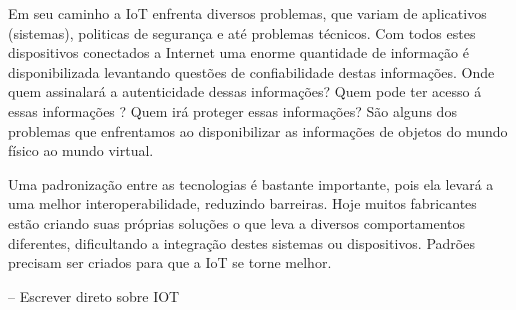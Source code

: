 Em seu caminho a IoT enfrenta diversos problemas, que variam de aplicativos (sistemas), politicas de segurança e até problemas técnicos. Com todos estes dispositivos conectados a Internet uma enorme quantidade de informação é disponibilizada levantando questões de confiabilidade destas informações. Onde quem assinalará a autenticidade dessas informações? Quem pode ter acesso á essas informações ? Quem irá proteger essas informações? São alguns dos problemas que enfrentamos ao disponibilizar as informações de objetos do mundo físico ao mundo virtual.

Uma padronização entre as tecnologias é bastante importante, pois ela levará a uma melhor interoperabilidade, reduzindo barreiras. Hoje muitos fabricantes estão criando suas próprias soluções o que leva a diversos comportamentos diferentes, dificultando a integração destes sistemas ou dispositivos. Padrões precisam ser criados para que a IoT se torne melhor.




-- Escrever direto sobre IOT